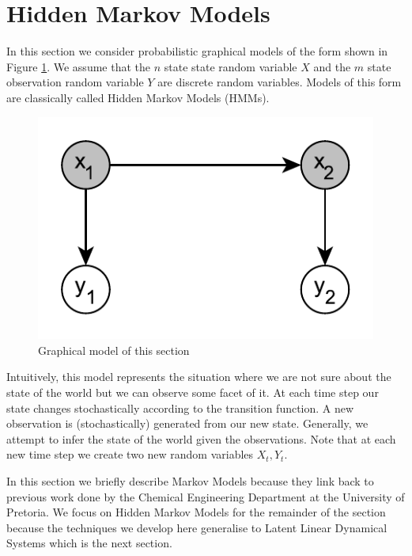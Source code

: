 \documentclass[../masters.tex]{subfiles}
\begin{document}
\graphicspath{{./imgs/}{../imgs/}} %

\section{Hidden Markov Models}
In this section we consider probabilistic graphical models of the form shown in Figure \ref{fig_linmod}. We assume that the  $n$ state state random variable $X$ and the $m$ state observation random variable $Y$ are discrete random variables. Models of this form are classically called Hidden Markov Models (HMMs).
\begin{figure}[H] 
\centering
\includegraphics[scale=1.0]{hmm_model.pdf}
\caption{Graphical model of this section}
\label{fig_linmod}
\end{figure}
Intuitively, this model represents the situation where we are not sure about the state of the world but we can observe some facet of it. At each time step our state changes stochastically according to the transition function. A new observation is (stochastically) generated from our new state. Generally, we attempt to infer the state of the world given the observations. Note that at each new time step we create two new random variables $X_t, Y_t$.

In this section we briefly describe Markov Models because they link back to previous work done by the Chemical Engineering Department at the University of Pretoria. We focus on Hidden Markov Models for the remainder of the section because the techniques we develop here generalise to Latent Linear Dynamical Systems which is the next section. 
\end{document}
